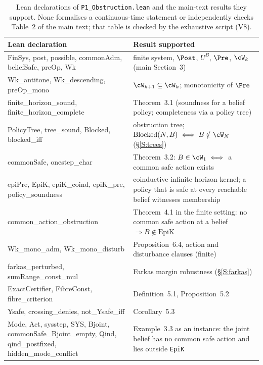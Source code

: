 \begin{table}[htbp]
\centering\small
\begin{tabularx}{\textwidth}{@{}>{\ttfamily\raggedright\arraybackslash}p{}X@{}}
\toprule
\normalfont Lean declaration & Result supported\\
\midrule
FinSys, post, possible, commonAdm, beliefSafe, preOp, Wk & finite system, $\Post$, $U^B$, $\Pre$, $\cW_k$ (main Section~3)\\
Wk\_antitone, Wk\_descending, preOp\_mono & $\cW_{k+1}\subseteq\cW_k$; monotonicity of $\Pre$\\
finite\_horizon\_sound, finite\_horizon\_complete & Theorem~3.1 (soundness for a belief policy; completeness via a policy tree)\\
PolicyTree, tree\_sound, Blocked, blocked\_iff & obstruction tree; $\mathrm{Blocked}(N,B)\iff B\notin\cW_N$ (\S\ref{S:trees})\\
commonSafe, onestep\_char & Theorem~3.2: $B\in\cW_1\iff$ a common safe action exists\\
epiPre, EpiK, epiK\_coind, epiK\_pre, policy\_soundness & coinductive infinite-horizon kernel; a policy that is safe at every reachable belief witnesses membership\\
common\_action\_obstruction & Theorem~4.1 in the finite setting: no common safe action at a belief $\Rightarrow B\notin\mathrm{EpiK}$\\
Wk\_mono\_adm, Wk\_mono\_disturb & Proposition~6.4, action and disturbance clauses (finite)\\
farkas\_perturbed, sumRange\_const\_mul & Farkas margin robustness (\S\ref{S:farkas})\\
ExactCertifier, FibreConst, fibre\_criterion & Definition~5.1, Proposition~5.2\\
Ysafe, crossing\_denies, not\_Ysafe\_iff & Corollary~5.3\\
Mode, Act, sysstep, SYS, Bjoint, commonSafe\_Bjoint\_empty, Qind, qind\_postfixed, hidden\_mode\_conflict & Example~3.3 as an instance: the joint belief has no common safe action and lies outside \texttt{EpiK}\\
\bottomrule
\end{tabularx}
\caption{Lean declarations of \texttt{P1\_Obstruction.lean} and the main-text results they support. None formalises a continuous-time statement or independently checks Table~2 of the main text; that table is checked by the exhaustive script (V8).}
\label{tab:lean}
\end{table}

